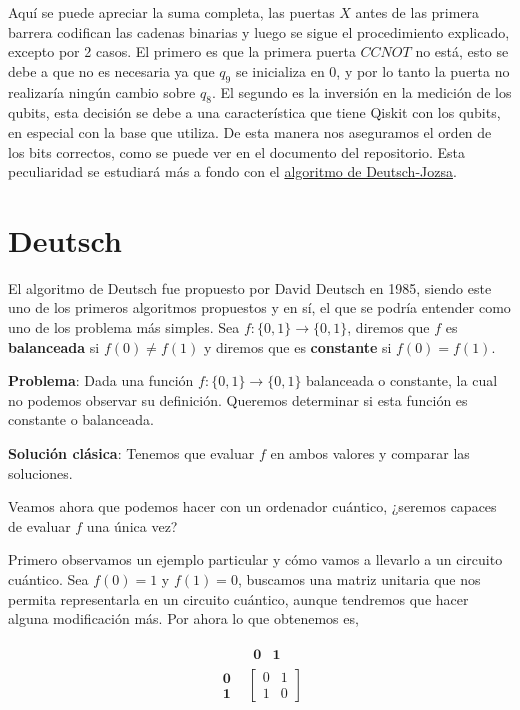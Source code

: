 Aquí se puede apreciar la suma completa, las puertas $X$ antes de las primera barrera codifican las cadenas binarias y luego se sigue el procedimiento explicado, excepto por 2 casos. El primero es que la primera puerta $CCNOT$ no está, esto se debe a que no es necesaria ya que $q_{9}$ se inicializa en 0, y por lo tanto la puerta no realizaría ningún cambio sobre $q_{8}$. El segundo es la inversión en la medición de los qubits, esta decisión se debe a una característica que tiene Qiskit con los qubits, en especial con la base que utiliza. De esta manera nos aseguramos el orden de los bits correctos, como se puede ver en el documento del repositorio. Esta peculiaridad se estudiará más a fondo con el \hyperref[A:DJ]{algoritmo de Deutsch-Jozsa}.


\section{Deutsch}
\label{Sec3.2:Deutsch}

 El algoritmo de Deutsch\cite{B:QuantumScientist:2008} fue propuesto por David Deutsch en 1985, siendo este uno de los primeros algoritmos propuestos y en sí, el que se podría entender como uno de los problema más simples. Sea $f:\{0,1\}\rightarrow\{0,1\}$, diremos que $f$ es \textbf{balanceada} si $f(0)\neq f(1)$ y diremos que es \textbf{constante} si $f(0)=f(1)$. \newline

 \textbf{Problema}: Dada una función $f:\{0,1\}\rightarrow\{0,1\}$ balanceada o constante, la cual no podemos observar su definición. Queremos determinar si esta función es constante o balanceada.\newline

 \textbf{Solución clásica}: Tenemos que evaluar $f$ en ambos valores y comparar las soluciones.\newline

 Veamos ahora que podemos hacer con un ordenador cuántico, ¿seremos capaces de evaluar $f$ una única vez? \newline

 Primero observamos un ejemplo particular y cómo vamos a llevarlo a un circuito cuántico. Sea $f(0)=1$ y $f(1)=0$, buscamos una matriz unitaria que nos permita representarla en un circuito cuántico, aunque tendremos que hacer alguna modificación más. Por ahora lo que obtenemos es,

 \begin{equation*}
     \begin{matrix}
           & \begin{matrix} \textbf{0} & \textbf{1} \end{matrix} \\
         \begin{matrix} \textbf{0} \\ \textbf{1} \end{matrix} & \begin{bmatrix}
             0 & 1 \\
             1 & 0
         \end{bmatrix}
     \end{matrix}
 \end{equation*}

